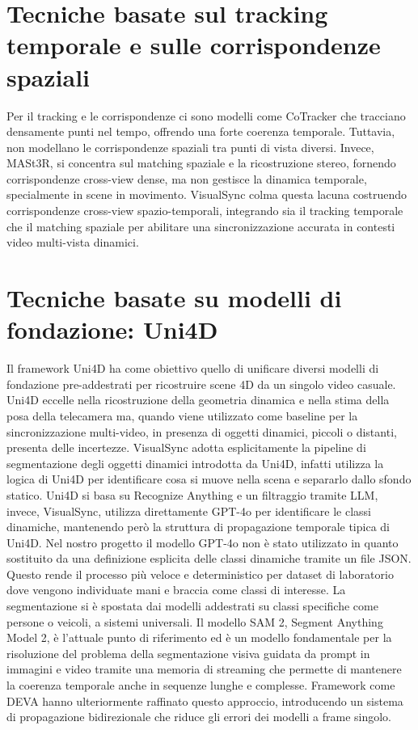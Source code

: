 \section{Tecniche basate sul tracking temporale e sulle corrispondenze spaziali}
Per il tracking e le corrispondenze ci sono modelli come CoTracker che tracciano densamente punti nel tempo, offrendo una forte coerenza temporale. Tuttavia, non modellano le corrispondenze spaziali tra punti di vista diversi. Invece, MASt3R, si concentra sul matching spaziale e la ricostruzione stereo, fornendo corrispondenze cross-view dense, ma non gestisce la dinamica temporale, specialmente in scene in movimento. VisualSync colma questa lacuna costruendo corrispondenze cross-view spazio-temporali, integrando sia il tracking temporale che il matching spaziale per abilitare una sincronizzazione accurata in contesti video multi-vista dinamici.

\section{Tecniche basate su modelli di fondazione: Uni4D}
Il framework Uni4D \cite{uni4d} ha come obiettivo quello di unificare diversi modelli di fondazione pre-addestrati per ricostruire scene 4D da un singolo video casuale. Uni4D eccelle nella ricostruzione della geometria dinamica e nella stima della posa della telecamera ma, quando viene utilizzato come baseline per la sincronizzazione multi-video, in presenza di oggetti dinamici, piccoli o distanti, presenta delle incertezze. VisualSync adotta esplicitamente la pipeline di segmentazione degli oggetti dinamici introdotta da Uni4D, infatti utilizza la logica di Uni4D per identificare cosa si muove nella scena e separarlo dallo sfondo statico. Uni4D si basa su Recognize Anything e un filtraggio tramite LLM, invece, VisualSync, utilizza direttamente GPT-4o per identificare le classi dinamiche, mantenendo però la struttura di propagazione temporale tipica di Uni4D. Nel nostro progetto il modello GPT-4o non è stato utilizzato in quanto sostituito da una definizione esplicita delle classi dinamiche tramite un file JSON. Questo rende il processo più veloce e deterministico per dataset di laboratorio dove vengono individuate mani e braccia come classi di interesse.
La segmentazione si è spostata dai modelli addestrati su classi specifiche come persone o veicoli, a sistemi universali. Il modello SAM 2, Segment Anything Model 2, è l'attuale punto di riferimento ed è un modello fondamentale per la risoluzione del problema della segmentazione visiva guidata da prompt in immagini e video tramite una memoria di streaming che permette di mantenere la coerenza temporale anche in sequenze lunghe e complesse. Framework come DEVA hanno ulteriormente raffinato questo approccio, introducendo un sistema di propagazione bidirezionale che riduce gli errori dei modelli a frame singolo.